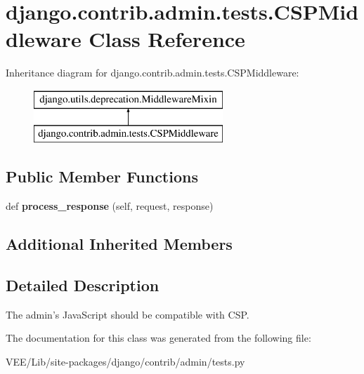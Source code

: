 \hypertarget{classdjango_1_1contrib_1_1admin_1_1tests_1_1_c_s_p_middleware}{}\section{django.\+contrib.\+admin.\+tests.\+C\+S\+P\+Middleware Class Reference}
\label{classdjango_1_1contrib_1_1admin_1_1tests_1_1_c_s_p_middleware}
Inheritance diagram for django.\+contrib.\+admin.\+tests.\+C\+S\+P\+Middleware\+:\begin{figure}[H]
\begin{center}
\leavevmode
\includegraphics[height=2.000000cm]{classdjango_1_1contrib_1_1admin_1_1tests_1_1_c_s_p_middleware}
\end{center}
\end{figure}
\subsection*{Public Member Functions}
\begin{DoxyCompactItemize}
\item 
\mbox{\label{classdjango_1_1contrib_1_1admin_1_1tests_1_1_c_s_p_middleware_abe339aa3925209b79de6b79956ac36e3}} 
def {\bfseries process\+\_\+response} (self, request, response)
\end{DoxyCompactItemize}
\subsection*{Additional Inherited Members}


\subsection{Detailed Description}
\begin{DoxyVerb}The admin's JavaScript should be compatible with CSP.\end{DoxyVerb}
 

The documentation for this class was generated from the following file\+:\begin{DoxyCompactItemize}
\item 
V\+E\+E/\+Lib/site-\/packages/django/contrib/admin/tests.\+py\end{DoxyCompactItemize}
